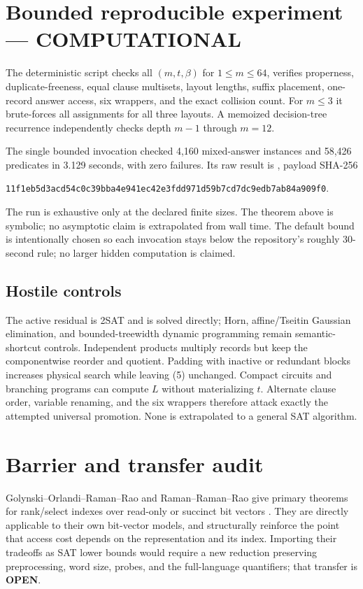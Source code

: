 \documentclass[11pt]{article}
\newcommand{\COMP}{\textbf{COMPUTATIONAL}}
\newcommand{\OPEN}{\textbf{OPEN}}
\begin{document}
\section{Bounded reproducible experiment --- \COMP}

The deterministic script
checks all $(m,t,\beta)$ for $1\le m\le64$, verifies properness,
duplicate-freeness, equal clause multisets, layout lengths, suffix placement,
one-record answer access, six wrappers, and the exact collision count.
For $m\le3$ it brute-forces all assignments for all three layouts.  A memoized
decision-tree recurrence independently checks depth $m-1$ through $m=12$.

The single bounded invocation checked 4,160 mixed-answer instances and
58,426 predicates in 3.129 seconds, with zero failures.  Its raw result is
,
payload SHA-256
\begin{center}
\texttt{11f1eb5d3acd54c0c39bba4e941ec42e3fdd971d59b7cd7dc9edb7ab84a909f0}.
\end{center}
The run is exhaustive only at the declared finite sizes.  The theorem above
is symbolic; no asymptotic claim is extrapolated from wall time.  The default
bound is intentionally chosen so each invocation stays below the repository's
roughly 30-second rule; no larger hidden computation is claimed.

\subsection*{Hostile controls}
The active residual is 2SAT and is solved directly; Horn, affine/Tseitin
Gaussian elimination, and bounded-treewidth dynamic programming remain
semantic-shortcut controls.  Independent products multiply records but keep
the componentwise reorder and quotient.  Padding with inactive or redundant
blocks increases physical search while leaving (5) unchanged.  Compact
circuits and branching programs can compute $L$ without materializing $t$.
Alternate clause order, variable renaming, and the six wrappers therefore
attack exactly the attempted universal promotion.  None is extrapolated to a
general SAT algorithm.

\section{Barrier and transfer audit}

Golynski--Orlandi--Raman--Rao and Raman--Raman--Rao give primary theorems for
rank/select indexes over read-only or succinct bit vectors
\cite{GORR11,RRR07}.  They are directly applicable to their own bit-vector
models, and structurally reinforce the point that access cost depends on the
representation and its index.  Importing their tradeoffs as SAT lower bounds
would require a new reduction preserving preprocessing, word size, probes,
and the full-language quantifiers; that transfer is \OPEN.
\end{document}
